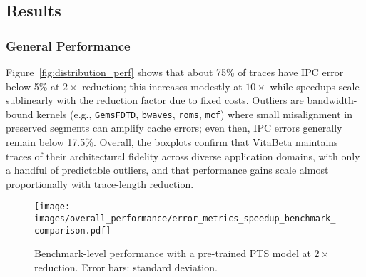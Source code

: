 \begin{figure*}[!htbp] 
    \centering
    \caption{Error distributions for $2\times$, $4\times$, and $10\times$ reductions on SPEC2006/2017, GAP, and server workloads using a pre-trained PTS model. Average speedups: $1.9\times$, $3.9\times$, $9.2\times$. \textit{\small Note: Unless stated otherwise, results in the section use an ImputeFormer pre-trained on a 10B-instruction \texttt{bfs-10} trace.}}
    \label{fig:distribution_perf}
\end{figure*}
\subsection{Results}
\subsubsection*{General Performance}
Figure~\ref{fig:distribution_perf} shows that about 75\% of traces have IPC error below 5\% at $2\times$ reduction; this increases modestly at $10\times$ while speedups scale sublinearly with the reduction factor due to fixed costs. Outliers are bandwidth-bound kernels (e.g., \texttt{GemsFDTD}, \texttt{bwaves}, \texttt{roms}, \texttt{mcf}) where small misalignment in preserved segments can amplify cache errors; even then, IPC errors generally remain below 17.5\%.
Overall, the boxplots confirm that VitaBeta maintains traces of their architectural fidelity across diverse application domains, with only a handful of predictable outliers, and that performance gains scale almost proportionally with trace-length reduction.
\begin{figure}[!htbp]
    \centering
    \setlength{\belowcaptionskip}{-10pt}
    \captionsetup{skip=3pt}
    \captionsetup[subfigure]{font=footnotesize, skip=1pt}
    \texttt{[image: images/overall\_performance/error\_metrics\_speedup\_benchmark\_comparison.pdf]}
    \caption{Benchmark-level performance with a pre-trained PTS model at $2\times$ reduction. Error bars: standard deviation.}
    \label{fig:benchmarks}
\end{figure}
